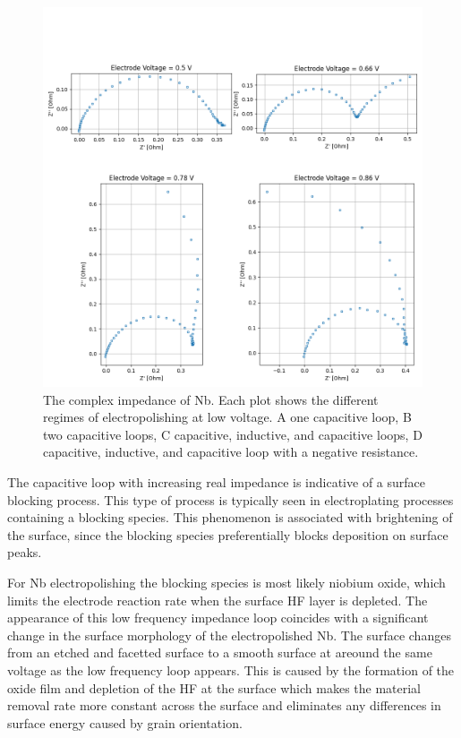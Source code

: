 \documentclass[11pt]{article}
\begin{document}
\begin{figure}[t]
  \label{fig:nyquistplot}
  \includegraphics[width=\textwidth]{../figures/nyquist.png}
  \caption{The complex impedance of Nb. Each plot shows the different regimes of electropolishing at low voltage. A one capacitive loop, B two capacitive loops, C capacitive, inductive, and capacitive loops, D capacitive, inductive, and capacitive loop with a negative resistance.}
\end{figure}

The capacitive loop with increasing real impedance is indicative of a surface blocking process. This type of process is typically seen in electroplating processes containing a blocking species. This phenomenon is associated with brightening of the surface, since the blocking species preferentially blocks deposition on surface peaks.

For Nb electropolishing the blocking species is most likely niobium oxide, which limits the electrode reaction rate when the surface HF layer is depleted. The appearance of this low frequency impedance loop coincides with a significant change in the surface morphology of the electropolished Nb. The surface changes from an etched and facetted surface to a smooth surface at areound the same voltage as the low frequency loop appears. This is caused by the formation of the oxide film and depletion of the HF at the surface which makes the material removal rate more constant across the surface and eliminates any differences in surface energy caused by grain orientation.
\end{document}

